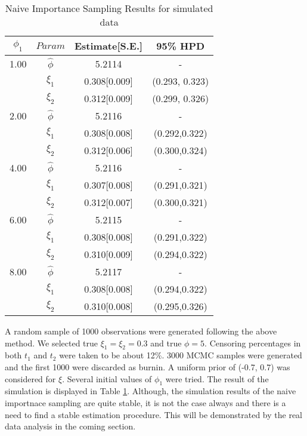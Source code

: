 \documentclass[11pt]{article}
\theoremstyle{remboldstyle}
\begin{document}
\begin{table}[h]
\caption{Naive Importance Sampling Results for simulated data}
\centering
\begin{tabular}{c c c c}
\hline
$\phi_{1}$ & $Param$      & Estimate[S.E.] & 95\% HPD\\
\hline
1.00          & $\hat{\phi}$ & 5.2114              & -\\
              & $\xi_1$      & 0.308[0.009]        & (0.293, 0.323)\\   
              & $\xi_2$      & 0.312[0.009]        & (0.299, 0.326)\\
              \hline 
2.00          & $\hat{\phi}$ & 5.2116              & -\\
              & $\xi_1$      & 0.308[0.008]        & (0.292,0.322)\\   
              & $\xi_2$      & 0.312[0.006]        & (0.300,0.324)\\
              \hline
4.00          & $\hat{\phi}$ & 5.2116              & -\\
              & $\xi_1$      & 0.307[0.008]        & (0.291,0.321)\\   
              & $\xi_2$      & 0.312[0.007]        & (0.300,0.321)\\
              \hline
6.00          & $\hat{\phi}$ & 5.2115              & -\\
              & $\xi_1$      & 0.308[0.008]        & (0.291,0.322)\\   
              & $\xi_2$      & 0.310[0.009]        & (0.294,0.322)\\
              \hline
8.00         & $\hat{\phi}$ & 5.2117              & -\\
              & $\xi_1$      & 0.308[0.008]        & (0.294,0.322)\\   
              & $\xi_2$      & 0.310[0.008]        & (0.295,0.326)\\
              \hline             
\end{tabular}
\label{tab1}
\end{table}

A random sample of 1000 observations were generated following the above method. We selected true $\xi_1 = \xi_2 = 0.3$ and true $\phi = 5$. Censoring percentages in both $t_1$ and $t_2$ were taken to be about 12\%. 3000 MCMC samples were generated and the first 1000 were discarded as burnin. A uniform prior of (-0.7, 0.7) was considered for $\xi$.  Several initial values of $\phi_1$ were tried. The result of the simulation is displayed in Table \ref{tab1}. Although, the simulation results of the naive importnace sampling are quite stable, it is not the case always and there is a need to find a stable estimation procedure. This will be demonstrated by the real data analysis in the coming section. 
\end{document}
